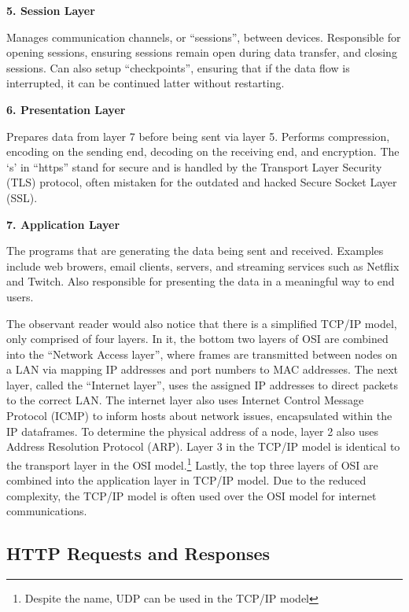 \documentclass[11pt]{article}
\begin{document}
{\vspace{\baselineskip}
\textbf{5. Session Layer}

Manages communication channels, or ``sessions'', between devices. Responsible for opening sessions, ensuring sessions remain open during data transfer, and closing sessions. Can also setup ``checkpoints'', ensuring that if the data flow is interrupted, it can be continued latter without restarting.

\vspace{\baselineskip}
\textbf{6. Presentation Layer}

Prepares data from layer 7 before being sent via layer 5. Performs compression, encoding on the sending end, decoding on the receiving end, and encryption. The `s' in ``https'' stand for secure and is handled by the Transport Layer Security (TLS) protocol, often mistaken for the outdated and hacked Secure Socket Layer (SSL).

\vspace{\baselineskip}
\textbf{7. Application Layer}

The programs that are generating the data being sent and received. Examples include web browers, email clients, servers, and streaming services such as Netflix and Twitch. Also responsible for presenting the data in a meaningful way to end users.
}

\vspace{\baselineskip}

The observant reader would also notice that there is a simplified TCP/IP model, only comprised of four layers. In it, the bottom two layers of OSI are combined into the ``Network Access layer'', where frames are transmitted between nodes on a LAN via mapping IP addresses and port numbers to MAC addresses. The next layer, called the ``Internet layer'', uses the assigned IP addresses to direct packets to the correct LAN. The internet layer also uses Internet Control Message Protocol (ICMP) to inform hosts about network issues, encapsulated within the IP dataframes. To determine the physical address of a node, layer 2 also uses Address Resolution Protocol (ARP). Layer 3 in the TCP/IP model is identical to the transport layer in the OSI model.\footnote{Despite the name, UDP can be used in the TCP/IP model} Lastly, the top three layers of OSI are combined into the application layer in TCP/IP model. Due to the reduced complexity, the TCP/IP model is often used over the OSI model for internet communications.


\subsection{HTTP Requests and Responses}
\end{document}
